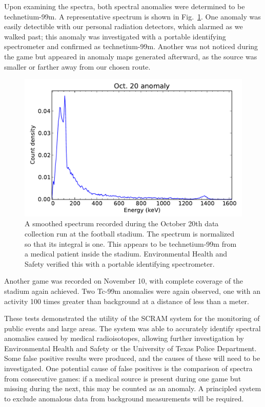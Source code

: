 Upon examining the spectra, both spectral anomalies were determined to be
technetium-99m. A representative spectrum is shown in
Fig.~\ref{oct20-spectrum}. One anomaly was easily detectible with our personal
radiation detectors, which alarmed as we walked past; this anomaly was
investigated with a portable identifying spectrometer and confirmed as
technetium-99m. Another was not noticed during the game but appeared in anomaly
maps generated afterward, as the source was smaller or farther away from our
chosen route.

\begin{figure}
  \centering
  \includegraphics[width=\textwidth]{figures/oct20-spectrum.pdf}
  \caption{A smoothed spectrum recorded during the October 20th data collection
    run at the football stadium. The spectrum is normalized so that its integral
    is one. This appears to be technetium-99m from a medical patient inside the
    stadium. Environmental Health and Safety verified this with a portable
    identifying spectrometer.}
  \label{oct20-spectrum}
\end{figure}

Another game was recorded on November 10, with complete coverage of the stadium
again achieved. Two Tc-99m anomalies were again observed, one with an activity
100 times greater than background at a distance of less than a meter.

These tests demonstrated the utility of the SCRAM system for the monitoring of
public events and large areas. The system was able to accurately identify
spectral anomalies caused by medical radioisotopes, allowing further
investigation by Environmental Health and Safety or the University of Texas
Police Department. Some false positive results were produced, and the causes of
these will need to be investigated. One potential cause of false positives is
the comparison of spectra from consecutive games: if a medical source is present
during one game but missing during the next, this may be counted as an
anomaly. A principled system to exclude anomalous data from background
measurements will be required.

